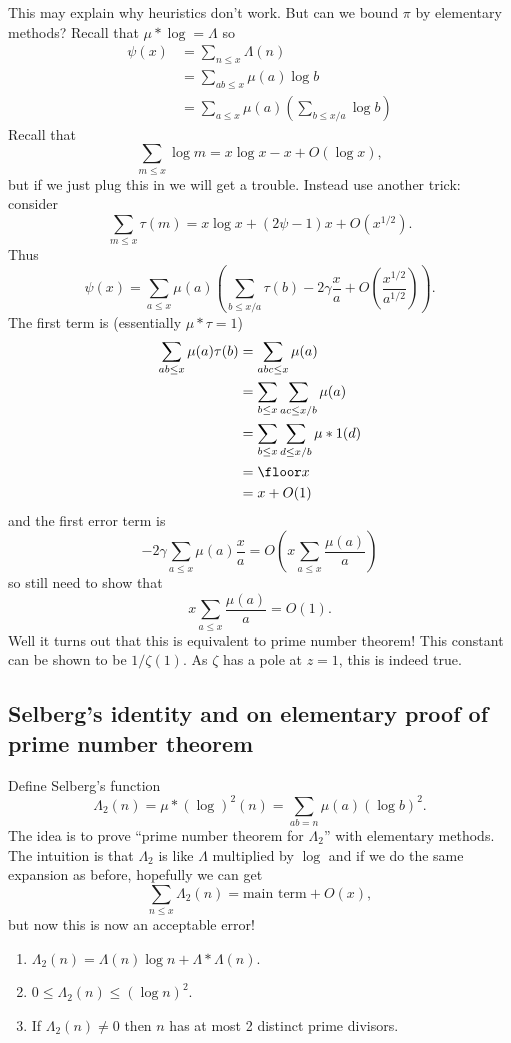 \documentclass[a4paper]{article}
\begin{document}
This may explain why heuristics don't work. But can we bound \(\pi\) by elementary methods? Recall that \(\mu * \log = \Lambda\) so
\begin{align*}
  \psi(x)
  &= \sum_{n \leq x} \Lambda(n) \\
  &= \sum_{ab \leq x} \mu(a) \log b \\
  &= \sum_{a \leq x} \mu(a) \left( \sum_{b \leq x/a} \log b \right)
\end{align*}
Recall that
\[
  \sum_{m \leq x} \log m = x \log x - x + O(\log x),
\]
but if we just plug this in we will get a trouble. Instead use another trick: consider
\[
  \sum_{m \leq x} \tau(m) = x \log x + (2 \psi - 1) x + O(x^{1/2}).
\]
Thus
\[
  \psi(x)
  = \sum_{a \leq x} \mu(a) \left( \sum_{b \leq x/a} \tau(b) - 2\gamma \frac{x}{a} + O(\frac{x^{1/2}}{a^{1/2}}) \right).
\]
The first term is (essentially \(\mu * \tau = 1\))
\begin{align*}
  \sum_{ab \leq x} \mu(a)\tau(b)
  &= \sum_{abc \leq x} \mu(a) \\
  &= \sum_{b \leq x} \sum_{ac \leq x/b} \mu(a) \\
  &= \sum_{b \leq x} \sum_{d \leq x/b} \mu * 1(d) \\
  &= \floor x \\
  &= x + O(1)
\end{align*}
and the first error term is
\[
  -2\gamma \sum_{a \leq x} \mu(a) \frac{x}{a} = O(x\sum_{a \leq x} \frac{\mu(a)}{a})
\]
so still need to show that
\[
  x \sum_{a \leq x} \frac{\mu(a)}{a} = O(1).
\]
Well it turns out that this is equivalent to prime number theorem! This constant can be shown to be \(1/\zeta(1)\). As \(\zeta\) has a pole at \(z = 1\), this is indeed true.

\subsection{Selberg's identity and on elementary proof of prime number theorem}

Define Selberg's function
\[
  \Lambda_2(n) = \mu* (\log )^2(n) = \sum_{ab = n} \mu(a) (\log b)^2.
\]
The idea is to prove ``prime number theorem for \(\Lambda_2\)'' with elementary methods. The intuition is that \(\Lambda_2\) is like \(\Lambda\) multiplied by \(\log\) and if we do the same expansion as before, hopefully we can get
\[
  \sum_{n \leq x} \Lambda_2(n) = \text{main term} + O(x),
\]
but now this is now an acceptable error!

\begin{lemma}\leavevmode
  \begin{enumerate}
  \item \(\Lambda_2(n) = \Lambda(n) \log n + \Lambda * \Lambda (n)\).
  \item \(0 \leq \Lambda_2(n) \leq (\log n)^2\).
  \item If \(\Lambda_2(n) \neq 0\) then \(n\) has at most 2 distinct prime divisors.
  \end{enumerate}
\end{lemma}
\end{document}
